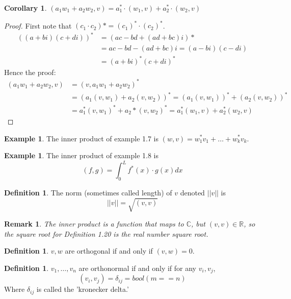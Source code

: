 \documentclass[12pt]{article}
\def\R{{\mathbb{R}}}
\def\C{{\mathbb{C}}}
\newcommand{\norm}[1]{|| #1 ||}
\numberwithin{theorem}{section}
\newtheorem{remark}[theorem]{Remark}
\theoremstyle{definition}
\newtheorem{definition}[theorem]{Definition}
\newtheorem{example}[theorem]{Example}
\newtheorem{corollary}[theorem]{Corollary}
\begin{document}
\begin{corollary}
    $(a_1 w_1 + a_2 w_2, v) = a_1^* \cdot (w_1,v) + a_2^* \cdot (w_2, v)$
\end{corollary}

\begin{proof}
    First note that $(c_1\cdot c_2)* = (c_1)^* \cdot (c_2)^*$.
    \begin{align*}
        ((a+bi)(c+di))^* &= (ac-bd + (ad+bc)i)* \\
        &= ac-bd - (ad+bc)i = (a-bi)(c-di)\\
        &= (a+bi)^* (c+di)^*
    \end{align*}
    Hence the proof:
    \begin{align*}
        (a_1 w_1 + a_2 w_2, v) &= (v, a_1 w_1 + a_2 w_2)^*\\
        &= (a_1 (v, w_1) + a_2 (v, w_2))^* = (a_1 (v, w_1))^* + (a_2 (v, w_2))^*\\
        &= a_1^* (v, w_1)^* + a_2* (v, w_2)^* = a_1^* (w_1, v) + a_2^* (w_2, v)
    \end{align*}
\end{proof}

\begin{example}
    The inner product of example 1.7 is $(w,v) = w_1^* v_1 + \dots + w_k^* v_k$.
\end{example}

\begin{example}
    The inner product of example 1.8 is
    $$(f,g) = \int_{0}^{L} f^*(x)\cdot g(x) dx$$
\end{example}

\begin{definition}
    The norm (sometimes called length) of $v$ denoted $\norm{v}$ is $$\norm{v} = \sqrt{(v,v)}$$
\end{definition}

\begin{remark}
    The inner product is a function that maps to $\C$, but $(v,v)\in\R$, so the square root for Definition 1.20 is the real number square root.
\end{remark}

\begin{definition}
    $v,w$ are orthogonal if and only if $(v,w) = 0$.
\end{definition}

\begin{definition}
    $v_1, \dots, v_n$ are orthonormal if and only if for any $v_i, v_j$,
    $$(v_i, v_j) = \delta_{ij} = bool(m==n)$$
    Where $\delta_{ij}$ is called the 'kronecker delta.'
\end{definition}
\end{document}
